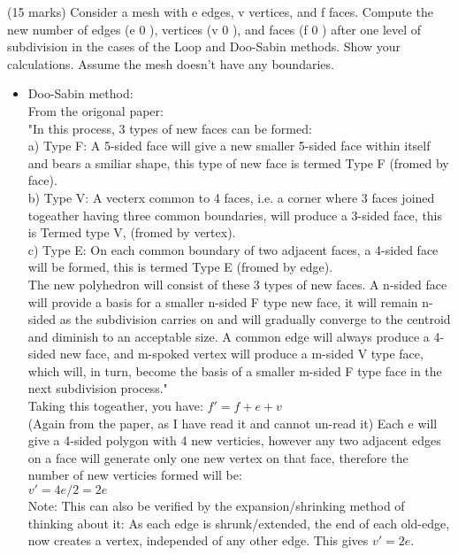 (15 marks) Consider a mesh with e edges, v vertices, and f faces. Compute the new number
of edges (e 0 ), vertices (v 0 ), and faces (f 0 ) after one level of subdivision in the cases of the
Loop and Doo-Sabin methods. Show your calculations. Assume the mesh doesn’t have any
boundaries.
\begin{itemize}
\item Doo-Sabin method: \\
From the origonal paper: \\
"In this process, 3 types of new faces can be formed: \\
a) Type F: A 5-sided face will give a new smaller 5-sided face within itself and bears a smiliar shape, this type of new face is termed Type F (fromed by face). \\
b) Type V: A vecterx common to 4 faces, i.e. a corner where 3 faces joined togeather having three common boundaries, will produce a 3-sided face, this is Termed type V, (fromed by vertex). \\
c) Type E: On each common boundary of two adjacent faces, a 4-sided face will be formed, this is termed Type E (fromed by edge). \\

  The new polyhedron will consist of these 3 types of new faces. A n-sided face will provide a basis for a smaller n-sided F type new face, it will remain n-sided as the subdivision carries on and will gradually converge to the centroid and diminish to an acceptable size. A common edge will always produce a 4-sided new face, and m-spoked vertex will produce a m-sided V type face, which will, in turn, become the basis of a smaller m-sided F type face in the next subdivision process." \\

Taking this togeather, you have:
$f' = f + e + v$ \\

(Again from the paper, as I have read it and cannot un-read it)
Each e will give a 4-sided polygon with 4 new verticies, however any two adjacent edges on a face will generate only one new vertex on that face, therefore the number of new verticies formed will be: \\
$v' = 4 e / 2 = 2e$ \\
Note: This can also be verified by the expansion/shrinking method of thinking about it: As each edge is shrunk/extended, the end of each old-edge, now creates a vertex, independed of any other edge. This gives $v' = 2e$. \\


\end{itemize}
